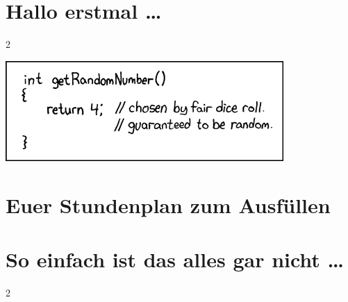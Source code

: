 \documentclass[a4paper,12pt]{scrartcl}
\newcommand{\spaltenanfang}{\begin{multicols}{2}}
\newcommand{\spaltenende}{\end{multicols}}
\begin{document}


{
\small
\tableofcontents
}

\newpage



\newpage
\section{Hallo erstmal …}

\spaltenanfang

\spaltenende

\vspace{10mm}
\begin{center}
\includegraphics[scale=1.0]{comics/random_number}
\end{center}

%
%


\newpage
\section{Euer Stundenplan zum Ausfüllen}




\newpage
\section{So einfach ist das alles gar nicht \dots}
\spaltenanfang

\spaltenende

\vspace{8mm}

\begin{center}
\end{center}


\end{document}
